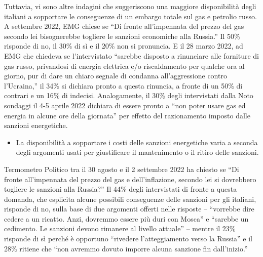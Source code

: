 \documentclass[
]{book}
\providecommand{\tightlist}{%
  \setlength{\itemsep}{0pt}\setlength{\parskip}{0pt}}
\begin{document}
Tuttavia, vi sono altre indagini che suggeriscono una maggiore disponibilità degli italiani a sopportare le conseguenze di un embargo totale sul gas e petrolio russo. A settembre 2022, EMG chiese se ``Di fronte all'impennata del prezzo del gas secondo lei bisognerebbe togliere le sanzioni economiche alla Russia.'' Il 50\% risponde di no, il 30\% di sì e il 20\% non si pronuncia. E il 28 marzo 2022, ad EMG che chiedeva se l'intervistato ``sarebbe disposto a rinunciare alle forniture di gas russo, privandosi di energia elettrica e/o riscaldamento per qualche ora al giorno, pur di dare un chiaro segnale di condanna all'aggressione contro l'Ucraina,'' il 34\% si dichiara pronto a questa rinuncia, a fronte di un 50\% di contrari e un 16\% di indecisi. Analogamente, il 30\% degli intervistati dalla Noto sondaggi il 4-5 aprile 2022 dichiara di essere pronto a ``non poter usare gas ed energia in alcune ore della giornata'' per effetto del razionamento imposto dalle sanzioni energetiche.

\begin{itemize}
\tightlist
\item
  La disponibilità a sopportare i costi delle sanzioni energetiche varia a seconda degli argomenti usati per giustificare il mantenimento o il ritiro delle sanzioni.
\end{itemize}

Termometro Politico tra il 30 agosto e il 2 settembre 2022 ha chiesto se ``Di fronte all'impennata del prezzo del gas e dell'inflazione, secondo lei si dovrebbero togliere le sanzioni alla Russia?'' Il 44\% degli intervistati di fronte a questa domanda, che esplicita alcune possibili conseguenze delle sanzioni per gli italiani, risponde di no, sulla base di due argomenti offerti nelle risposte -- ``vorrebbe dire cedere a un ricatto. Anzi, dovremmo essere più duri con Mosca'' e ``sarebbe un cedimento. Le sanzioni devono rimanere al livello attuale'' -- mentre il 23\% risponde di sì perché è opportuno ``rivedere l'atteggiamento verso la Russia'' e il 28\% ritiene che ``non avremmo dovuto imporre alcuna sanzione fin dall'inizio.''
\end{document}
